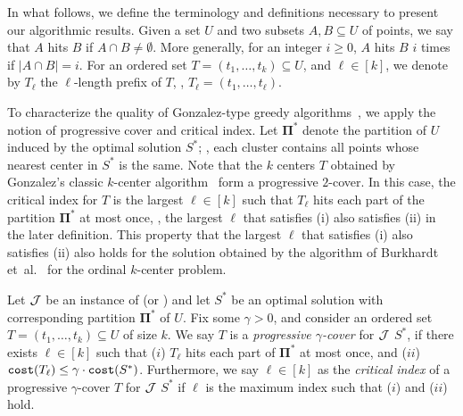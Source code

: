 In what follows, we define the terminology and definitions necessary to present our algorithmic results.
Given a  set $U$ and two subsets $A,B \subseteq U$ of points, we say that $A$ hits $B$ if $A \cap B \neq \emptyset$. More generally, for an integer $i \geq 0$, $A$ hits $B$ $i$ times if $|A \cap B|=i$. For an ordered set $T = (t_1,\dots,t_k) \subseteq U$, and $\ell \in [k]$, we denote by $T_\ell$ the $\ell$-length prefix of $T$, \ie, $T_\ell= (t_1,\dots, t_\ell)$.

To characterize the quality of Gonzalez-type greedy algorithms~\cite{gonzalez1985clustering, burkhardt2024low}, we apply the notion of progressive cover and critical index.
Let $\mathbf{\Pi}^*$ denote the partition of $U$ induced by the optimal solution $S^*$; \ie, each cluster contains all points whose nearest center in $S^*$ is the same.
Note that the $k$ centers $T$ obtained by Gonzalez's classic $k$-center algorithm~\cite{gonzalez1985clustering} form a progressive $2$-cover. 
In this case, the critical index for $T$ is the largest $\ell \in [k]$ such that $T_{\ell}$ hits each part of the partition $\mathbf{\Pi}^*$ at most once, \ie, the largest $\ell$ that satisfies (i) also satisfies (ii) in the later definition. 
This property that the largest $\ell$ that satisfies (i) also satisfies (ii) also holds for the solution obtained by the algorithm of Burkhardt et~al.~\cite{burkhardt2024low} for the ordinal $k$-center problem.

\begin{definition}
Let $\mathcal{J}$ be an instance of \kcenter (or \fairkcenter) and let $S^*$ be an optimal solution with corresponding partition $\mathbf{\Pi}^*$ of $U$. Fix some $\gamma >0$, and consider an ordered set $T=(t_1,\dots,t_k) \subseteq U$ of size $k$. We say $T$ is a \emph{progressive $\gamma$-cover} for $\mathcal{J}$ \wrt $S^*$, if there exists $\ell \in [k]$ such that ($i$) $T_{\ell}$ hits each part of $\mathbf{\Pi}^*$ at most once, and ($ii$) $\texttt{cost}(T_{\ell}) \leq \gamma\cdot \texttt{cost}(S^*)$. Furthermore, we say $\ell \in [k]$ as the \emph{critical index} of a progressive $\gamma$-cover $T$ for $\mathcal{J}$  \wrt $S^*$ if $\ell$ is the maximum index such that ($i$) and ($ii$) hold.
\end{definition}

